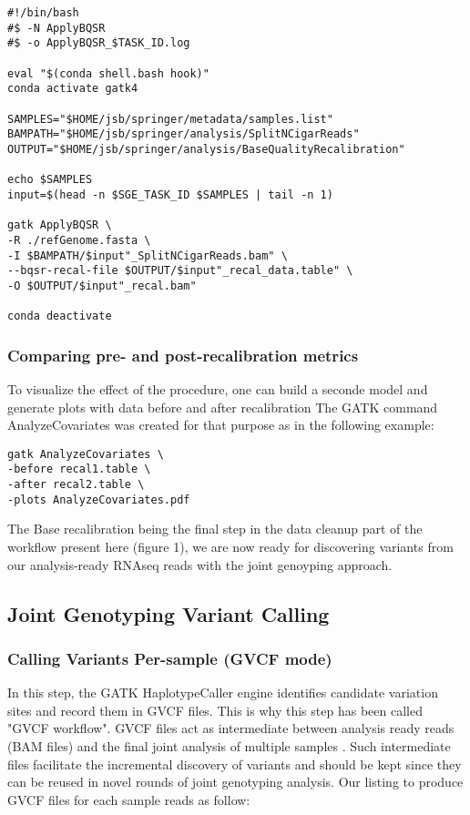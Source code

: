 \begin{verbatim}
#!/bin/bash
#$ -N ApplyBQSR
#$ -o ApplyBQSR_$TASK_ID.log

eval "$(conda shell.bash hook)"
conda activate gatk4

SAMPLES="$HOME/jsb/springer/metadata/samples.list"
BAMPATH="$HOME/jsb/springer/analysis/SplitNCigarReads"
OUTPUT="$HOME/jsb/springer/analysis/BaseQualityRecalibration"

echo $SAMPLES
input=$(head -n $SGE_TASK_ID $SAMPLES | tail -n 1)

gatk ApplyBQSR \
-R ./refGenome.fasta \
-I $BAMPATH/$input"_SplitNCigarReads.bam" \
--bqsr-recal-file $OUTPUT/$input"_recal_data.table" \
-O $OUTPUT/$input"_recal.bam"

conda deactivate
\end{verbatim}

\subsubsection{Comparing pre- and post-recalibration metrics}

To visualize the effect of the procedure, one can build a seconde model and generate plots with data before and after recalibration \cite{GATK_BaseQuality} The GATK command AnalyzeCovariates was created for that purpose as in the following example:

\begin{verbatim}
gatk AnalyzeCovariates \
-before recal1.table \
-after recal2.table \
-plots AnalyzeCovariates.pdf
\end{verbatim}

The Base recalibration being the final step in the data cleanup part of the workflow present here (figure 1), we are now ready for discovering variants from our analysis-ready RNAseq reads with the joint genoyping approach.

\subsection{Joint Genotyping Variant Calling}

\subsubsection{Calling Variants Per-sample (GVCF mode)}

In this step, the GATK HaplotypeCaller engine identifies candidate variation sites and record them in GVCF files. This is why this step has been called "GVCF workflow". GVCF files act as intermediate between analysis ready reads (BAM files) and the final joint analysis of multiple samples \cite{GATK_jointCalling_1}. Such intermediate files facilitate the incremental discovery of variants and should be kept since they can be reused in novel rounds of joint genotyping analysis. Our listing to produce GVCF files for each sample reads as follow:

